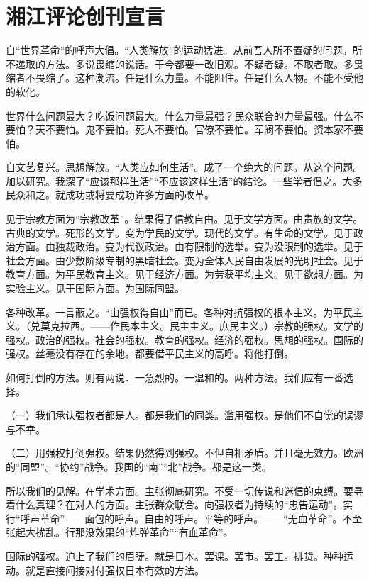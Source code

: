 \section{湘江评论创刊宣言}



自“世界革命”的呼声大倡。“人类解放”的运动猛进。从前吾人所不置疑的问题。所不递取的方法。多说畏缩的说话。于今都要一改旧观。不疑者疑。不取者取。多畏缩者不畏缩了。这种潮流。任是什么力量。不能阻住。任是什么人物。不能不受他的软化。

世界什么问题最大？吃饭问题最大。什么力量最强？民众联合的力量最强。什么不要怕？天不要怕。鬼不要怕。死人不要怕。官僚不要怕。军阀不要怕。资本家不要怕。

自文艺复兴。思想解放。“人类应如何生活”。成了一个绝大的问题。从这个问题。加以研究。我深了“应该那样生活”“不应该这样生活”的结论。一些学者倡之。大多民众和之。就成功或将要成功许多方面的改革。

见于宗教方面为“宗教改革”。结果得了信教自由。见于文学方面。由贵族的文学。古典的文学。死形的文学。变为学民的文学。现代的文学。有生命的文学。见于政治方面。由独裁政治。变为代议政治。由有限制的选举。变为没限制的选举。见于社会方面。由少数阶级专制的黑暗社会。变为全体人民自由发展的光明社会。见于教育方面。为平民教育主义。见于经济方面。为劳获平均主义。见于欲想方面。为实验主义。见于国际方面。为国际同盟。

各种改革。一言蔽之。“由强权得自由”而已。各种对抗强权的根本主义。为平民主义。（兑莫克拉西。——作民本主义。民主主义。庶民主义。）宗教的强权。文学的强权。政治的强权。社会的强权。教育的强权。经济的强权。思想的强权。国际的强权。丝毫没有存在的余地。都要借平民主义的高呼。将他打倒。

如何打倒的方法。则有两说．一急烈的。一温和的。两种方法。我们应有一番选择。

（一）我们承认强权者都是人。都是我们的同类。滥用强权。是他们不自觉的误谬与不幸。

（二）用强权打倒强权。结果仍然得到强权。不但自相矛盾。并且毫无效力。欧洲的“同盟”。“协约”战争。我国的“南”“北”战争。都是这一类。

所以我们的见解。在学术方面。主张彻底研究。不受一切传说和迷信的束缚。要寻着什么真理？在对人的方面。主张群众联合。向强权者为持续的“忠告运动”。实行“呼声革命”——面包的呼声。自由的呼声。平等的呼声。——“无血革命”。不至张起大扰乱。行那没效果的“炸弹革命”“有血革命”。

国际的强权。迫上了我们的眉睫。就是日本。罢课。罢市。罢工。排货。种种运动。就是直接间接对付强权日本有效的方法。

